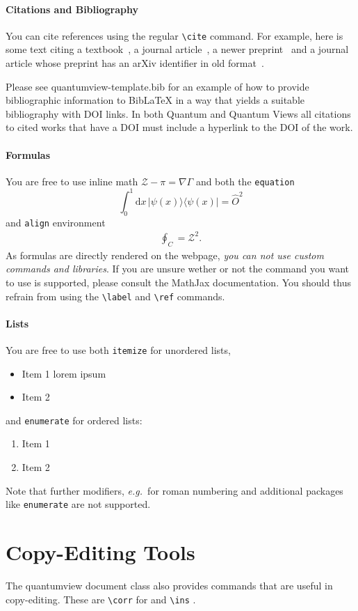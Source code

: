 \documentclass{quantumview}
\begin{document}
\paragraph{Citations and Bibliography} You can cite references using the regular \texttt{{\textbackslash}cite} command. For example, here is some text citing a textbook~\cite{Nielsen_Chuang_2000}, a journal article~\cite{Preskill2018}, a newer preprint~\cite{SchwarzhansLockErkerFriisHuber2020} and a journal article whose preprint has an arXiv identifier in old format~\cite{AcinBrussLewensteinSanpera2001}.

Please see quantumview-template.bib for an example of how to provide bibliographic information to BibLaTeX in a way that yields a suitable bibliography with DOI links.
In both Quantum and Quantum Views all citations to cited works that have a DOI must include a hyperlink to the DOI of the work.

\paragraph{Formulas} You are free to use inline math $\mathcal{Z} - \pi = \nabla \Gamma$ and both the \texttt{equation}
\begin{equation}
    \int_0^1 \mathrm{d}x \, |\psi(x)\rangle \! \langle \psi(x)|= \hat{O}^2
\end{equation}
and \texttt{align} environment
\begin{align}
    \oint_C = \mathcal{Z}^2.
\end{align}
As formulas are directly rendered on the webpage, \emph{you can not use custom commands and libraries}. If you are unsure wether or not the command you want to use is supported, please consult the MathJax documentation. You should thus refrain from using the \texttt{{\textbackslash}label} and \texttt{{\textbackslash}ref} commands.

\paragraph{Lists} You are free to use both \texttt{itemize} for unordered lists,
\begin{itemize}
    \item Item 1 lorem ipsum
    \item Item 2
\end{itemize}
and \texttt{enumerate} for ordered lists:
\begin{enumerate}
    \item Item 1
    \item Item 2
\end{enumerate}
Note that further modifiers, \emph{e.g.}\ for roman numbering and additional packages like \texttt{enumerate} are not supported.

\section{Copy-Editing Tools}
The quantumview document class also provides commands that are useful in copy-editing. These are \texttt{{\textbackslash}corr} for  and \texttt{{\textbackslash}ins} .



\end{document}
